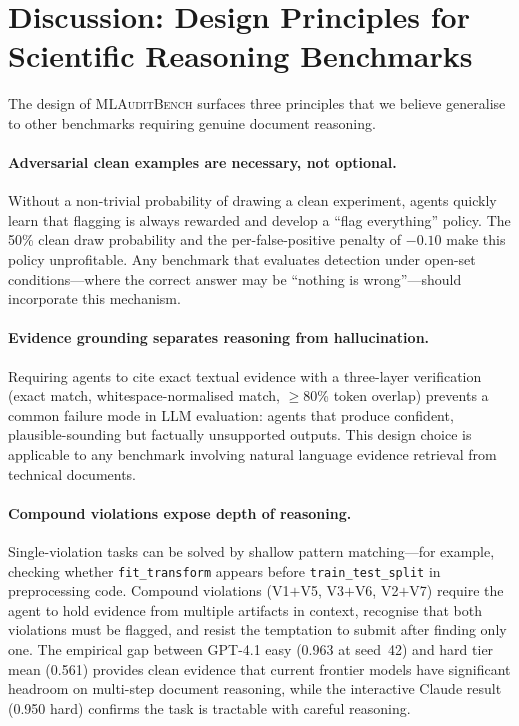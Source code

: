 \documentclass{article}
\begin{document}
\section{Discussion: Design Principles for Scientific Reasoning Benchmarks}
\label{sec:discussion}

The design of \textsc{MLAuditBench} surfaces three principles that we believe generalise to other benchmarks requiring genuine document reasoning.

\paragraph{Adversarial clean examples are necessary, not optional.}
Without a non-trivial probability of drawing a clean experiment, agents quickly learn that flagging is always rewarded and develop a ``flag everything'' policy.
The 50\% clean draw probability and the per-false-positive penalty of $-0.10$ make this policy unprofitable.
Any benchmark that evaluates detection under open-set conditions---where the correct answer may be ``nothing is wrong''---should incorporate this mechanism.

\paragraph{Evidence grounding separates reasoning from hallucination.}
Requiring agents to cite exact textual evidence with a three-layer verification (exact match, whitespace-normalised match, $\geq$80\% token overlap) prevents a common failure mode in LLM evaluation: agents that produce confident, plausible-sounding but factually unsupported outputs.
This design choice is applicable to any benchmark involving natural language evidence retrieval from technical documents.

\paragraph{Compound violations expose depth of reasoning.}
Single-violation tasks can be solved by shallow pattern matching---for example, checking whether \texttt{fit\_transform} appears before \texttt{train\_test\_split} in preprocessing code.
Compound violations (V1$+$V5, V3$+$V6, V2$+$V7) require the agent to hold evidence from multiple artifacts in context, recognise that both violations must be flagged, and resist the temptation to submit after finding only one.
The empirical gap between GPT-4.1 easy (0.963 at seed~42) and hard tier mean (0.561) provides clean evidence that current frontier models have significant headroom on multi-step document reasoning, while the interactive Claude result (0.950 hard) confirms the task is tractable with careful reasoning.
\end{document}
